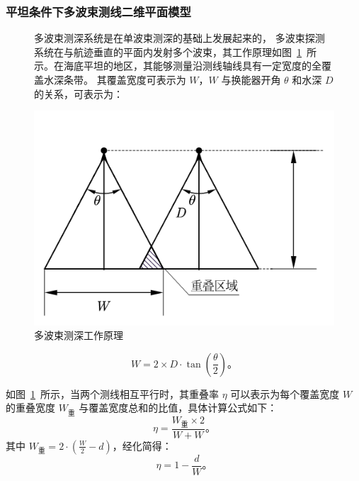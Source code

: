 \documentclass[withoutpreface,bwprint]{cumcmthesis} %
\begin{document}
    \subsubsection{平坦条件下多波束测线二维平面模型}
    \begin{figure}[htbp]
        \centering
        \begin{minipage}[b]{0.35\textwidth}
            多波束测深系统是在单波束测深的基础上发展起来的，
            多波束探测系统在与航迹垂直的平面内发射多个波束，其工作原理如图~\ref{1}~所示。在海底平坦的地区，其能够测量沿测线轴线具有一定宽度的全覆盖水深条带。
            其覆盖宽度可表示为 $W$，$W$ 与换能器开角 $\theta$ 和水深 $D$ 的关系，可表示为：
        
    
        \end{minipage}%
        \begin{minipage}[b]{0.4\textwidth}
            \centering
            \includegraphics[height=0.19\textheight]{单波平面.png}
            \caption{多波束测深工作原理}
            \label{1}
        \end{minipage}
    \end{figure}

    \begin{equation}
        W = 2 \times D \cdot \tan\left(\frac{\theta}{2}\right) \text{。}
    \end{equation}
    

    如图~\ref{1}~所示，当两个测线相互平行时，其重叠率 $\eta$ 可以表示为每个覆盖宽度 $W$ 的重叠宽度 $W_\text{重}$ 与覆盖宽度总和的比值，具体计算公式如下：
    \begin{equation}
        \eta = \frac{W_\text{重} \times 2}{W + W} \text{。}
        \label{eq2}
    \end{equation}
    其中 $W_\text{重} = 2 \cdot \left(\frac{W}{2} - d\right)$，经化简得：
    \begin{equation}
        \eta = 1 - \frac{d}{W} \text{。}
    \end{equation}
\end{document}
